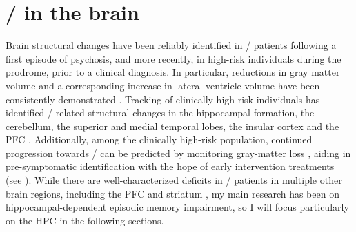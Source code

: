 \section{\Scz/ in the brain}
\label{sec:intro:scz:brain}
Brain structural changes have been reliably identified in \scz/ patients following a first episode of psychosis, and more recently, in high-risk individuals during the prodrome, prior to a clinical diagnosis.
In particular, reductions in gray matter volume and a corresponding increase in lateral ventricle volume have been consistently demonstrated \citep{Fusar-Poli2013, Shepherd2012}.
Tracking of clinically high-risk individuals has identified \scz/-related structural changes in the hippocampal formation, the cerebellum, the superior and medial temporal lobes, the insular cortex and the \ac{PFC} \citep{Cannon2015, Millan2016}.
Additionally, among the clinically high-risk population, continued progression towards \scz/ can be predicted by monitoring gray-matter loss \citep{Tognin2014}, aiding in pre-symptomatic identification with the hope of early intervention treatments (see ).
While there are well-characterized deficits in \scz/ patients in multiple other brain regions, including the \ac{PFC} \citep{Weinberger1986} and striatum \citep{Simpson2010}, my main research has been on hippocampal-dependent episodic memory impairment, so I will focus particularly on the \ac{HPC} in the following sections.

